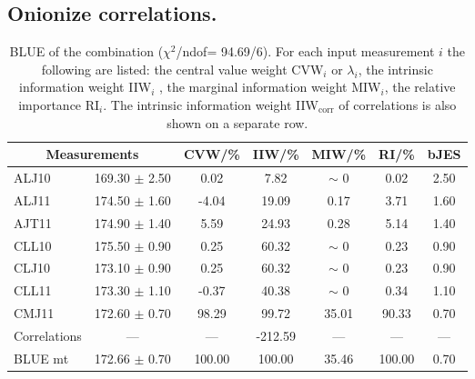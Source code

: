 \subsection{Onionize correlations.}
\begin{table}[H]
\scriptsize
\begin{center}
\renewcommand{\arraystretch}{1.1}
\begin{tabular}{|lc|c|c|c|c|c|}
\hline
\multicolumn{2}{|c|}{Measurements} & CVW/\%  & IIW/\%  & MIW/\%  & RI/\%  & {\tiny bJES}\\
\hline
ALJ10 &     169.30 $\pm$       2.50 &       0.02 &       7.82 &  {\tiny $\sim$ }0 &       0.02 &       2.50\\
ALJ11 &     174.50 $\pm$       1.60 &      -4.04 &      19.09 &       0.17 &       3.71 &       1.60\\
AJT11 &     174.90 $\pm$       1.40 &       5.59 &      24.93 &       0.28 &       5.14 &       1.40\\
CLL10 &     175.50 $\pm$       0.90 &       0.25 &      60.32 &  {\tiny $\sim$ }0 &       0.23 &       0.90\\
CLJ10 &     173.10 $\pm$       0.90 &       0.25 &      60.32 &  {\tiny $\sim$ }0 &       0.23 &       0.90\\
CLL11 &     173.30 $\pm$       1.10 &      -0.37 &      40.38 &  {\tiny $\sim$ }0 &       0.34 &       1.10\\
CMJ11 &     172.60 $\pm$       0.70 &      98.29 &      99.72 &      35.01 &      90.33 &       0.70\\
Correlations & --- & --- &    -212.59 & --- & --- & ---\\
\hline
BLUE {\tiny mt} &     172.66 $\pm$       0.70 &     100.00 &     100.00 &      35.46 &     100.00 &       0.70\\
\hline
\end{tabular}
\caption{BLUE of the combination ($\chi^2$/ndof=     94.69/6).
 For each input measurement $i$ the following are listed: the central value weight CVW$_i$ or $\lambda_i$, the intrinsic information weight IIW$_i$ , the marginal information weight MIW$_i$, the relative importance RI$_i$. The intrinsic information weight IIW$_{\mathrm{corr}}$ of correlations is also shown on a separate row.}
\renewcommand{\arraystretch}{1}
\end{center}
\end{table}

